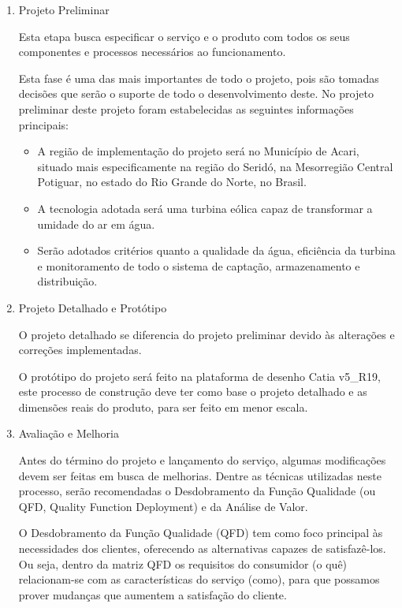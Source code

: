\begin{enumerate}
  \item Projeto Preliminar
  
    Esta etapa busca especificar o serviço e o produto com todos os seus componentes e processos necessários ao funcionamento.
    
    Esta fase é uma das mais importantes de todo o projeto, pois são tomadas decisões que serão o suporte de todo o
    desenvolvimento deste. No projeto preliminar deste projeto foram estabelecidas as seguintes informações principais: 
    
    \begin{itemize}
     \item A região de implementação do projeto será no Município de Acari, situado mais especificamente na região do Seridó, 
	na Mesorregião Central Potiguar, no estado do Rio Grande do Norte, no Brasil.
     
     \item A tecnologia adotada será uma turbina eólica capaz de transformar a umidade do ar em água.
     
     \item Serão adotados critérios quanto a qualidade da água, eficiência da turbina e 
	monitoramento de todo o sistema de captação, armazenamento e distribuição.     
    \end{itemize}
    
  \item Projeto Detalhado e Protótipo
  
    O projeto detalhado se diferencia do projeto preliminar devido às alterações e correções implementadas.
    
    O protótipo do projeto será feito na plataforma de desenho Catia v5\_R19, este processo de construção deve ter como 
    base o projeto detalhado e as dimensões reais do produto, para ser feito em menor escala.

  \item Avaliação e Melhoria
  
    Antes do término do projeto e lançamento do serviço, algumas modificações devem ser feitas em busca de melhorias. 
    Dentre as técnicas utilizadas neste processo, serão recomendadas o Desdobramento da Função Qualidade
    (ou QFD, Quality Function Deployment) e da Análise de Valor.
    
    O Desdobramento da Função Qualidade (QFD) tem como foco principal às necessidades dos clientes, oferecendo as
    alternativas capazes de satisfazê-los. Ou seja, dentro da matriz QFD os requisitos do consumidor (o quê) relacionam-se
    com as características do serviço (como), para que possamos prover mudanças que aumentem a satisfação do cliente.
    

\end{enumerate}
